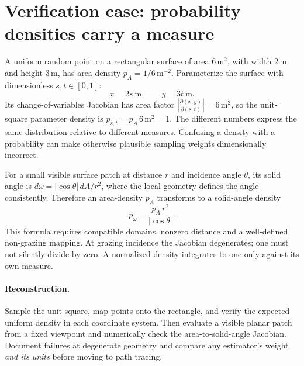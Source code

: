 \clearpage
\section*{Verification case: probability densities carry a measure}
\noindent A uniform random point on a rectangular surface of area
\(6\,\mathrm m^2\), with width \(2\,\mathrm m\) and height
\(3\,\mathrm m\), has area-density
\(p_A=1/6\,\mathrm m^{-2}\). Parameterize the surface with
dimensionless \(s,t\in[0,1]\):
\[
x=2s\ \mathrm m,\qquad y=3t\ \mathrm m.
\]
Its change-of-variables Jacobian has area factor
\(\left|\frac{\partial(x,y)}{\partial(s,t)}\right|=6\,
\mathrm m^2\), so the unit-square parameter density is
\(p_{s,t}=p_A\,6\,\mathrm m^2=1\).
The different numbers express the same distribution relative to
different measures. Confusing a density with a probability can make
otherwise plausible sampling weights dimensionally incorrect.

For a small visible surface patch at distance \(r\) and incidence
angle \(\theta\), its solid angle is
\(d\omega=|\cos\theta|\,dA/r^2\), where the local geometry
defines the angle consistently. Therefore an area-density
\(p_A\) transforms to a solid-angle density
\[
p_\omega=\frac{p_A\,r^2}{|\cos\theta|}.
\]
This formula requires compatible domains, nonzero distance and a
well-defined non-grazing mapping. At grazing incidence the
Jacobian degenerates; one must not silently divide by zero.
A normalized density integrates to one only against its own
measure.

\paragraph{Reconstruction.}
Sample the unit square, map points onto the rectangle, and
verify the expected uniform density in each coordinate system.
Then evaluate a visible planar patch from a fixed viewpoint and
numerically check the area-to-solid-angle Jacobian.
Document failures at degenerate geometry and compare any estimator's
weight \emph{and its units} before moving to path tracing.
